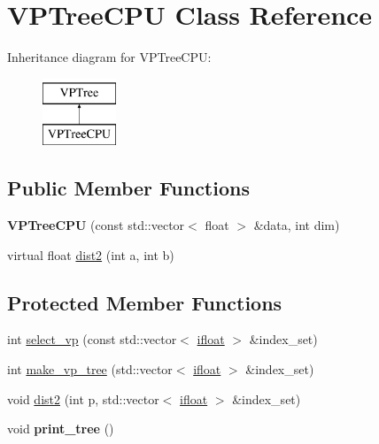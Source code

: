 \hypertarget{classVPTreeCPU}{}\section{V\+P\+Tree\+C\+P\+U Class Reference}
\label{classVPTreeCPU}
Inheritance diagram for V\+P\+Tree\+C\+P\+U\+:\begin{figure}[H]
\begin{center}
\leavevmode
\includegraphics[height=2.000000cm]{classVPTreeCPU}
\end{center}
\end{figure}
\subsection*{Public Member Functions}
\begin{DoxyCompactItemize}
\item 
\hypertarget{classVPTreeCPU_ae657717bae418b4fb8980d06bc3408ce}{}{\bfseries V\+P\+Tree\+C\+P\+U} (const std\+::vector$<$ float $>$ \&data, int dim)\label{classVPTreeCPU_ae657717bae418b4fb8980d06bc3408ce}

\item 
virtual float \hyperlink{classVPTreeCPU_ab0a19f258e0ee042e7a244a2e2a06eb0}{dist2} (int a, int b)
\end{DoxyCompactItemize}
\subsection*{Protected Member Functions}
\begin{DoxyCompactItemize}
\item 
int \hyperlink{classVPTreeCPU_a5f1383c790fde3e76205d15d2948adca}{select\+\_\+vp} (const std\+::vector$<$ \hyperlink{classifloatn}{ifloat} $>$ \&index\+\_\+set)
\item 
int \hyperlink{classVPTreeCPU_a6b43ff7e4f9385c2674530a68b70f203}{make\+\_\+vp\+\_\+tree} (std\+::vector$<$ \hyperlink{classifloatn}{ifloat} $>$ \&index\+\_\+set)
\item 
void \hyperlink{classVPTreeCPU_a6ea3cda7de7a4d12ec453d22e6873a12}{dist2} (int p, std\+::vector$<$ \hyperlink{classifloatn}{ifloat} $>$ \&index\+\_\+set)
\item 
\hypertarget{classVPTreeCPU_a561eceaafc0efb117e432e7009ce0aab}{}void {\bfseries print\+\_\+tree} ()\label{classVPTreeCPU_a561eceaafc0efb117e432e7009ce0aab}

\end{DoxyCompactItemize}
